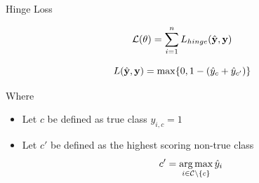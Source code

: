 \documentclass{beamer}
\begin{document}
\begin{frame}{Hinge Loss}

  \[{\mathcal{L}(\theta)} = \sum_{i=1}^n L_{hinge}(\hat{\mathbf{y}}, \mathbf{y}) \] 


  \[ L(\hat{\mathbf{y}}, \mathbf{y}) =  \max\{0, 1 - (\hat{y}_{c} + \hat{y}_{c'}) \}  \]

  Where 
  \begin{itemize}
  \item   Let $c$ be defined as true class $y_{i, c} = 1$  
  \item   Let $c'$ be defined as the highest scoring non-true class 
    \[c' = \argmax_{i \in \mcC \setminus\{c\}} \hat{y}_i \] 
  \end{itemize}
\end{frame}




\end{document}
